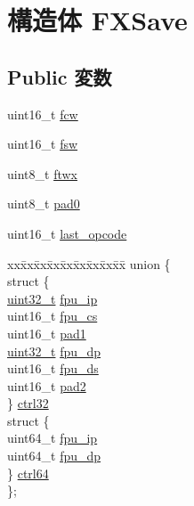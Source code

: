 \hypertarget{structFXSave}{
\section{構造体 FXSave}
\label{structFXSave}
}
\subsection*{Public 変数}
\begin{DoxyCompactItemize}
\item 
uint16\_\-t \hyperlink{structFXSave_a2e33b01fe25cb595f498d300575eb310}{fcw}
\item 
uint16\_\-t \hyperlink{structFXSave_ab22d66ef6012b705c21f163e38fa496e}{fsw}
\item 
uint8\_\-t \hyperlink{structFXSave_addcc4f7870490ea9e67f5dc07e006436}{ftwx}
\item 
uint8\_\-t \hyperlink{structFXSave_a0976e33e213bf38d277b829252a1ceaa}{pad0}
\item 
uint16\_\-t \hyperlink{structFXSave_af045c87671e2eb37893823accf88cdf4}{last\_\-opcode}
\item 
\begin{tabbing}
xx\=xx\=xx\=xx\=xx\=xx\=xx\=xx\=xx\=\kill
union \{\\
\>struct \{\\
\>\>\hyperlink{Type_8hh_a435d1572bf3f880d55459d9805097f62}{uint32\_t} \hyperlink{structFXSave_a430709a6aa845157a983ffded5f938e8}{fpu\_ip}\\
\>\>uint16\_t \hyperlink{structFXSave_a9e1ff8dcee2230b850a8ebad5a3cfe9c}{fpu\_cs}\\
\>\>uint16\_t \hyperlink{structFXSave_aeda1089d148f69b0f990f48cfbb032e6}{pad1}\\
\>\>\hyperlink{Type_8hh_a435d1572bf3f880d55459d9805097f62}{uint32\_t} \hyperlink{structFXSave_adc6b50ce448b7e118864611e4f80ee61}{fpu\_dp}\\
\>\>uint16\_t \hyperlink{structFXSave_ae8bf13dd3c5654df9542311b92c4e018}{fpu\_ds}\\
\>\>uint16\_t \hyperlink{structFXSave_a06d0aede0e856b45130b687a03806893}{pad2}\\
\>\} \hyperlink{structFXSave_af69905133d4607345c4b0986153f4998}{ctrl32}\\
\>struct \{\\
\>\>uint64\_t \hyperlink{structFXSave_a9d1147f0ccb3568dcb8ea59f67ff4c82}{fpu\_ip}\\
\>\>uint64\_t \hyperlink{structFXSave_a60420f19a7fba4f2815a6128337b64dd}{fpu\_dp}\\
\>\} \hyperlink{structFXSave_a5b1d40e273056ed663af234fa7cdc543}{ctrl64}\\
\}; \\


\end{tabbing}
\end{DoxyCompactItemize}

